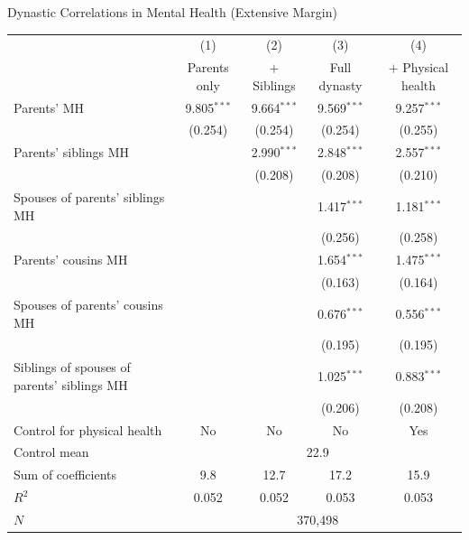 \documentclass[aspectratio=169]{beamer}
\begin{document}
\begin{frame}{Dynastic Correlations in Mental Health (Extensive Margin)}
  \scriptsize
  \begin{tabular}{lcccc}
  \toprule
  & (1) & (2) & (3) & (4) \\
  & Parents only & $+$ Siblings & Full dynasty & $+$ Physical health \\
  \midrule
  Parents' MH
    & 9.805$^{***}$ & 9.664$^{***}$ & 9.569$^{***}$ & 9.257$^{***}$ \\
    & (0.254) & (0.254) & (0.254) & (0.255) \\
  Parents' siblings MH
    & & 2.990$^{***}$ & 2.848$^{***}$ & 2.557$^{***}$ \\
    & & (0.208) & (0.208) & (0.210) \\
  Spouses of parents' siblings MH
    & & & 1.417$^{***}$ & 1.181$^{***}$ \\
    & & & (0.256) & (0.258) \\
  Parents' cousins MH
    & & & 1.654$^{***}$ & 1.475$^{***}$ \\
    & & & (0.163) & (0.164) \\
  Spouses of parents' cousins MH
    & & & 0.676$^{***}$ & 0.556$^{***}$ \\
    & & & (0.195) & (0.195) \\
  Siblings of spouses of parents' siblings MH
    & & & 1.025$^{***}$ & 0.883$^{***}$ \\
    & & & (0.206) & (0.208) \\
  \midrule
  Control for physical health & No & No & No & Yes \\
  Control mean & \multicolumn{4}{c}{22.9} \\
  Sum of coefficients & 9.8 & 12.7 & 17.2 & 15.9 \\
  $R^2$ & 0.052 & 0.052 & 0.053 & 0.053 \\
  $N$ & \multicolumn{4}{c}{370,498} \\
  \bottomrule
  \end{tabular}
\end{frame}
\end{document}
